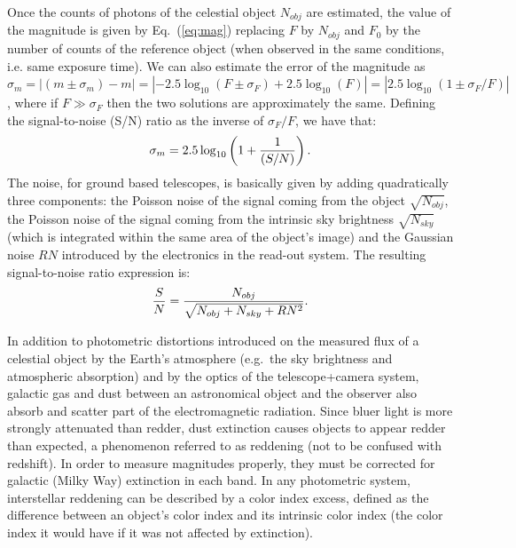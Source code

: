 Once the counts of photons of the celestial object $N_{obj}$ are estimated, the value of the magnitude is given by Eq.~(\ref{eq:mag}) replacing $F$ by $N_{obj}$ and $F_0$ by the number of counts of the reference object (when observed in the same conditions, i.e. same exposure time). We can also estimate the error of the magnitude as $\sigma_m = |(m \pm \sigma_m) - m| = |- 2.5\log_{10}(F\pm \sigma_F) + 2.5\log_{10}(F)| = |2.5\log_{10}(1 \pm \sigma_F/F)|$, 
where if $F\gg\sigma_F$ then the two solutions are approximately the same. Defining the signal-to-noise (S/N) ratio as the inverse of $\sigma_F/F$, we have that:
\begin{equation}
\sigma_m = 2.5\log_{10}\left(1+{1\over(S/N)}\right).
\end{equation}
The noise, for ground based telescopes, is basically given by adding quadratically three components: the Poisson noise of the signal coming from the object $\sqrt{N_{obj}}$, the Poisson noise of the signal coming from the intrinsic sky brightness $\sqrt{N_{sky}}$ (which is integrated within the same area of the object's image) and the Gaussian noise $RN$ introduced by the electronics in the read-out system. The resulting signal-to-noise ratio expression is:
\begin{equation}
{S \over N} = {N_{obj}\over \sqrt{N_{obj}+N_{sky}+RN^2}}.
\end{equation}

In addition to photometric distortions introduced on the measured flux of a celestial object by the Earth's atmosphere (e.g.~the sky brightness and atmospheric absorption) and by the optics of the telescope+camera system, galactic gas and dust between an astronomical object and the observer also absorb and scatter part of the electromagnetic radiation. Since bluer light is more strongly attenuated than redder, dust extinction causes objects to appear redder than expected, a phenomenon referred to as reddening (not to be confused with redshift). In order to measure magnitudes properly, they must be corrected for galactic (Milky Way) extinction in each band. In any photometric system, interstellar reddening can be described by a color index excess, defined as the difference between an object's color index and its intrinsic color index (the color index it would have if it was not affected by extinction).
